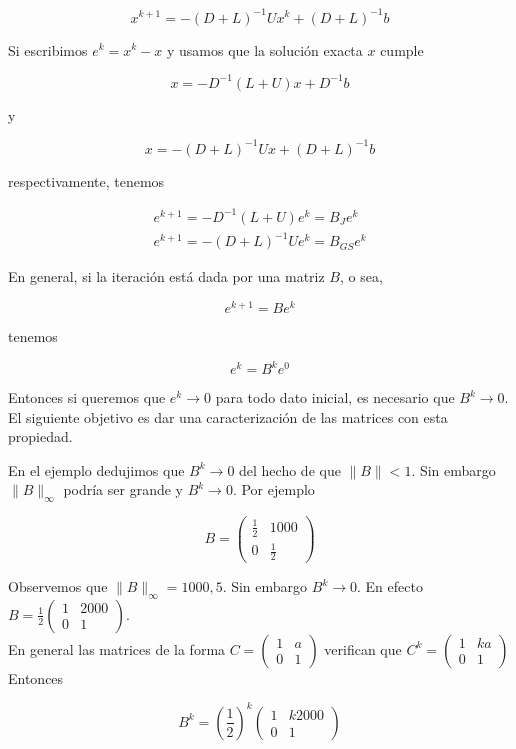 \documentclass[10pt]{article}
\begin{document}
$$
x^{k+1}=-(D+L)^{-1} U x^{k}+(D+L)^{-1} b
$$

Si escribimos $e^{k}=x^{k}-x$ y usamos que la solución exacta $x$ cumple

$$
x=-D^{-1}(L+U) x+D^{-1} b
$$

y

$$
x=-(D+L)^{-1} U x+(D+L)^{-1} b
$$

respectivamente, tenemos

$$
\begin{gathered}
e^{k+1}=-D^{-1}(L+U) e^{k}=B_{J} e^{k} \\
e^{k+1}=-(D+L)^{-1} U e^{k}=B_{G S} e^{k}
\end{gathered}
$$

En general, si la iteración está dada por una matriz $B$, o sea,

$$
e^{k+1}=B e^{k}
$$

tenemos

$$
e^{k}=B^{k} e^{0}
$$

Entonces si queremos que $e^{k} \rightarrow 0$ para todo dato inicial, es necesario que $B^{k} \rightarrow 0$. El siguiente objetivo es dar una caracterización de las matrices con esta propiedad.

En el ejemplo dedujimos que $B^{k} \rightarrow 0$ del hecho de que $\|B\|<1$. Sin embargo $\|B\|_{\infty}$ podría ser grande y $B^{k} \rightarrow 0$. Por ejemplo

$$
B=\left(\begin{array}{cc}
\frac{1}{2} & 1000 \\
0 & \frac{1}{2}
\end{array}\right)
$$

Observemos que $\|B\|_{\infty}=1000,5$. Sin embargo $B^{k} \rightarrow 0$. En efecto $B=\frac{1}{2}\left(\begin{array}{cc}1 & 2000 \\ 0 & 1\end{array}\right)$.\\
En general las matrices de la forma $C=\left(\begin{array}{cc}1 & a \\ 0 & 1\end{array}\right)$ verifican que $C^{k}=\left(\begin{array}{cc}1 & k a \\ 0 & 1\end{array}\right)$\\
Entonces

$$
B^{k}=\left(\frac{1}{2}\right)^{k}\left(\begin{array}{cc}
1 & k 2000 \\
0 & 1
\end{array}\right)
$$
\end{document}
